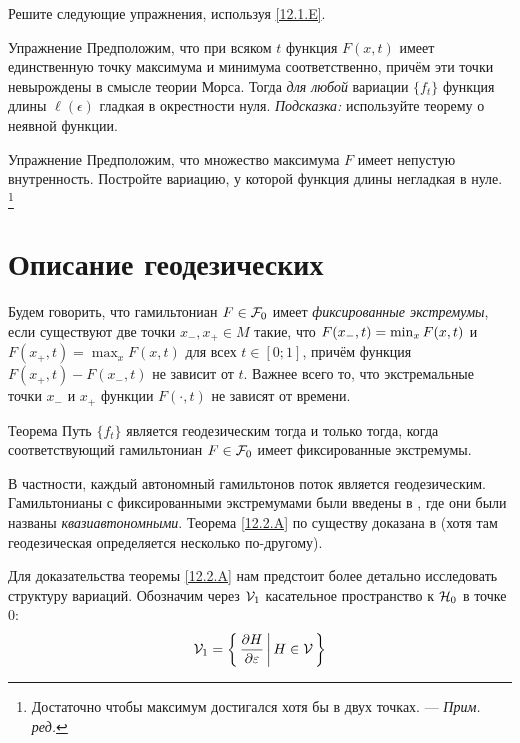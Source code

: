 Решите следующие упражнения, используя \ref{12.1.E}.

\begin{ex}{Упражнение}\label{12.1.F}
Предположим, что при всяком $t$ функция $F(x, t)$ имеет единственную
точку максимума и минимума соответственно, причём эти точки
невырождены в смысле теории Морса. 
Тогда \textit{для любой} вариации $\{f_t\}$ функция длины $\ell(\epsilon)$ гладкая в окрестности нуля. 
\emph{Подсказка:} используйте теорему о неявной функции.
\end{ex}

\begin{ex}{Упражнение}\label{12.1.G}
Предположим, что множество максимума $F$ имеет непустую внутренность.
Постройте вариацию, у которой функция длины негладкая в нуле.%
\footnote{Достаточно чтобы максимум достигался хотя бы в двух точках. — \textit{Прим. ред.}}
\end{ex}

\section{Описание геодезических}\label{sec:12.2}

Будем говорить, что гамильтониан $F\in \mathcal{F}_0$ имеет \emph{фиксированные экстремумы}, если существуют две точки $x_-, x_+\in M$ такие, что $F(x_-, t) \z= \min_x F(x, t)$ и $F(x_+, t) = \max_x F (x, t)$ для всех $t\in[0; 1]$, причём функция $F(x_+, t) - F(x_-, t)$ не зависит от $t$.
Важнее всего то, что экстремальные точки $x_-$ и $x_+$ функции $F(\cdot, t)$ не зависят от времени.

\begin{thm}{Теорема}\label{12.2.A}
Путь $\{f_t\}$ является геодезическим тогда и только тогда, когда соответствующий гамильтониан $F\in\mathcal{F}_0$ имеет фиксированные экстремумы.
\end{thm}

В частности, каждый автономный гамильтонов поток является геодезическим.
Гамильтонианы с фиксированными экстремумами были введены в \cite{BP1}, где они были названы \emph{квазиавтономными}.
Теорема \ref{12.2.A} по существу доказана в \cite{LM2} (хотя там геодезическая определяется несколько по-другому).

Для доказательства теоремы \ref{12.2.A} нам предстоит более детально исследовать структуру вариаций.
Обозначим через $\mathcal{V}_1$ касательное пространство к $\mathcal{H}_0$ в точке $0$: 
\[\mathcal{V}_1=\left\{ \,{\frac{\partial H}{\partial\varepsilon}}\, \middle| \,{H\in \mathcal{V}}\, \right\}\]

